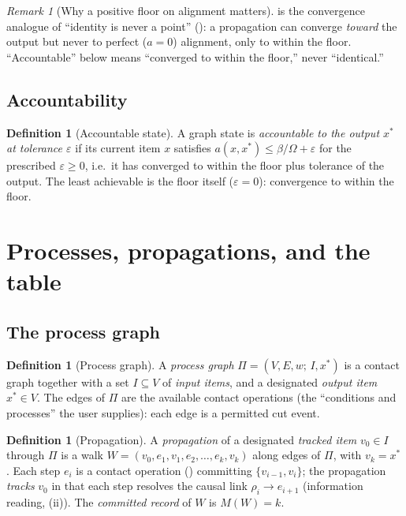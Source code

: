 \documentclass[11pt,a4paper]{article}
\theoremstyle{thmstyle}
\theoremstyle{definition}
\newtheorem{definition}[theorem]{Definition}
\theoremstyle{remark}
\newtheorem{remark}[theorem]{Remark}
\newcommand{\V}{V}
\newcommand{\E}{E}
\newcommand{\wt}{w}
\newcommand{\flo}{\beta}                 %
\newcommand{\rec}{M}                     %
\newcommand{\res}{\rho}                  %
\newcommand{\Proc}{\Pi}                  %
\newcommand{\eps}{\varepsilon}
\begin{document}
\begin{remark}[Why a positive floor on alignment matters]
\label{rem:align-floor}
 is the convergence analogue of ``identity is never
a point'' (): a propagation can converge \emph{toward} the
output but never to perfect ($a=0$) alignment, only to within the floor.
``Accountable'' below means ``converged to within the floor,'' never
``identical.''
\end{remark}

\subsection{Accountability}

\begin{definition}[Accountable state]
\label{def:accountable}
A graph state is \emph{accountable to the output $x^{\ast}$ at tolerance
$\eps$} if its current item $x$ satisfies $a(x,x^{\ast})\le\flo/\Omega+\eps$
for the prescribed $\eps\ge0$, i.e.\ it has converged to within the floor
plus tolerance of the output. The least achievable is the floor itself
($\eps=0$): convergence to within the floor.
\end{definition}

\section{Processes, propagations, and the table}
\label{sec:table}

\subsection{The process graph}

\begin{definition}[Process graph]
\label{def:process-graph}
A \emph{process graph} $\Proc=(\V,\E,\wt;\,I,x^{\ast})$ is a contact graph
together with a set $I\subseteq\V$ of \emph{input items}, and a designated
\emph{output item} $x^{\ast}\in\V$. The edges of $\Proc$ are the available
contact operations (the ``conditions and processes'' the user supplies):
each edge is a permitted cut event.
\end{definition}

\begin{definition}[Propagation]
\label{def:propagation}
A \emph{propagation} of a designated \emph{tracked item} $v_0\in I$ through
$\Proc$ is a walk $W=(v_0,e_1,v_1,e_2,\dots,e_k,v_k)$ along edges of
$\Proc$, with $v_k=x^{\ast}$. Each step $e_i$ is a contact operation
() committing $\{v_{i-1},v_i\}$; the propagation
\emph{tracks} $v_0$ in that each step resolves the causal link
$\res_i\to e_{i+1}$ (information reading, (ii)).
The \emph{committed record} of $W$ is $\rec(W)=k$.
\end{definition}
\end{document}
